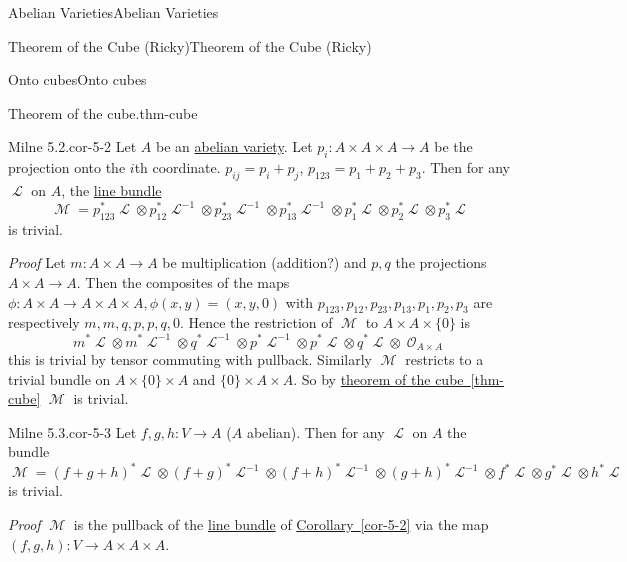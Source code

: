 \documentclass[10pt,]{book}
\makeatletter
\renewcommand*{\proofname}{Proof}
\renewenvironment{proof}[1][\proofname]{\par
  \pushQED{\qed}%
  \normalfont \topsep6\p@\@plus6\p@\relax
  \trivlist
  \item\relax
    {\itshape
    #1\@addpunct{.}}\hspace\labelsep\ignorespaces
}{%
  \popQED\endtrivlist\@endpefalse
}
\numberwithin{equation}{section}
\newcommand{\sheaf}[1]{\operatorname{\mathcal{#1}}}
\makeatother
\begin{document}
\begin{chapterptx}{Abelian Varieties}{}{Abelian Varieties}{}{}
\begin{sectionptx}{Theorem of the Cube (Ricky)}{}{Theorem of the Cube (Ricky)}{}{}
\begin{subsectionptx}{Onto cubes}{}{Onto cubes}{}{}
\begin{theorem}{Theorem of the cube.}{}{thm-cube}
\end{theorem}
\begin{corollary}{Milne 5.2.}{}{cor-5-2}%
\hypertarget{p-123}{}%
Let \(A\) be an \hyperref[def-buntes-abvar]{abelian variety}. Let \(p_i\colon A\times A\times A \to A\) be the projection onto the \(i\)th coordinate. \(p_{ij} = p_i+p_j\), \(p_{123} = p_1+p_2+p_3\). Then for any \(\sheaf L\) on \(A\), the \hyperref[def-line-bundle]{line bundle}%
\begin{equation*}
\sheaf M  = p_{123}^*\sheaf L \otimes p_{12}^*\sheaf L^{-1}\otimes p_{23}^*\sheaf L^{-1}\otimes p_{13}^*\sheaf L^{-1} \otimes p_1^*\sheaf L \otimes p_2^*\sheaf L \otimes p_3^*\sheaf L
\end{equation*}
is trivial.%
\end{corollary}
\begin{proof}\hypertarget{proof-19}{}
\hypertarget{p-124}{}%
Let  \(m \colon A\times A \to A\) be multiplication (addition?) and \(p,q\) the projections \(A\times A \to A\). Then the composites of the maps \(\phi\colon A\times A \to A \times A \times A, \phi(x,y) = (x,y,0)\) with \(p_{123}, p_{12}, p_{23}, p_{13}, p_1, p_2, p_3\) are respectively \(m,m,q, p, p, q, 0\). Hence the restriction of \(\sheaf M\) to \(A \times A \times \{0\}\) is%
\begin{equation*}
m^* \sheaf L \otimes m^* \sheaf L^{-1} \otimes q^* \sheaf L^{-1} \otimes p^*\sheaf L^{-1} \otimes p^*\sheaf L \otimes q^*\sheaf L \otimes \sheaf O_{A\times A}
\end{equation*}
this is trivial by tensor commuting with pullback. Similarly \(\sheaf M\) restricts to a trivial bundle on \(A\times \{0\} \times A\) and \(\{0\}\times A \times A\). So by \hyperref[thm-cube]{theorem of the cube~\ref{thm-cube}} \(\sheaf M\) is trivial.%
\end{proof}
\begin{corollary}{Milne 5.3.}{}{cor-5-3}%
\hypertarget{p-125}{}%
Let \(f,g, h\colon V \to A\) (\(A\) abelian). Then for any \(\sheaf L\) on \(A\) the bundle%
\begin{equation*}
\sheaf M  = (f+g+h)^*\sheaf L \otimes (f+g)^*\sheaf L^{-1}\otimes (f+h)^*\sheaf L^{-1}\otimes (g+h)^*\sheaf L^{-1} \otimes   f^*\sheaf L \otimes   g^*\sheaf L \otimes   h^*\sheaf L
\end{equation*}
is trivial.%
\end{corollary}
\begin{proof}\hypertarget{proof-20}{}
\hypertarget{p-126}{}%
\(\sheaf M\) is the pullback of the \hyperref[def-line-bundle]{line bundle} of \hyperref[cor-5-2]{Corollary~\ref{cor-5-2}} via the map \((f,g,h) \colon V \to A\times A\times A\).%

\end{proof}
\end{subsectionptx}
\end{sectionptx}
\end{chapterptx}
\end{document}
